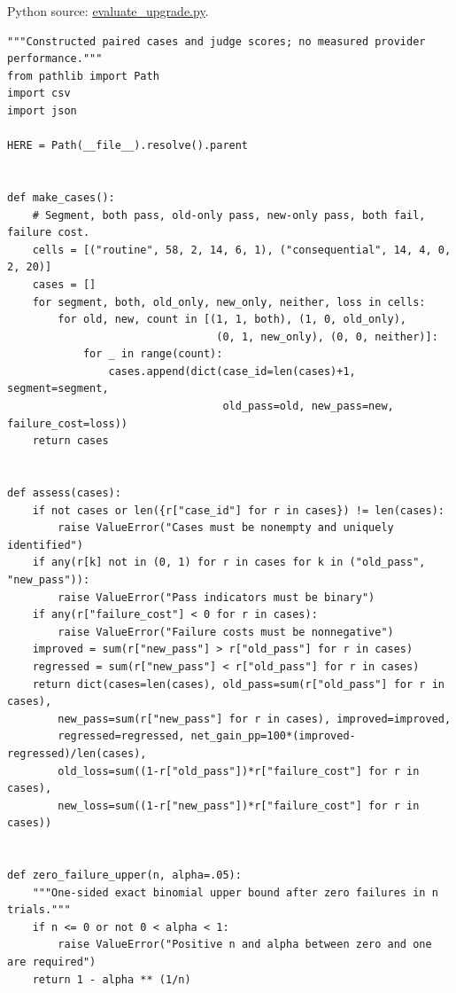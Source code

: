 \FloatBarrier
{}
Python source:
\href{../03_Data_and_Code/LLM_Revalidation/evaluate_upgrade.py}{evaluate\_upgrade.py}.

\begin{Verbatim}[breaklines,breakanywhere,fontsize=\small]
"""Constructed paired cases and judge scores; no measured provider performance."""
from pathlib import Path
import csv
import json

HERE = Path(__file__).resolve().parent


def make_cases():
    # Segment, both pass, old-only pass, new-only pass, both fail, failure cost.
    cells = [("routine", 58, 2, 14, 6, 1), ("consequential", 14, 4, 0, 2, 20)]
    cases = []
    for segment, both, old_only, new_only, neither, loss in cells:
        for old, new, count in [(1, 1, both), (1, 0, old_only),
                                 (0, 1, new_only), (0, 0, neither)]:
            for _ in range(count):
                cases.append(dict(case_id=len(cases)+1, segment=segment,
                                  old_pass=old, new_pass=new, failure_cost=loss))
    return cases


def assess(cases):
    if not cases or len({r["case_id"] for r in cases}) != len(cases):
        raise ValueError("Cases must be nonempty and uniquely identified")
    if any(r[k] not in (0, 1) for r in cases for k in ("old_pass", "new_pass")):
        raise ValueError("Pass indicators must be binary")
    if any(r["failure_cost"] < 0 for r in cases):
        raise ValueError("Failure costs must be nonnegative")
    improved = sum(r["new_pass"] > r["old_pass"] for r in cases)
    regressed = sum(r["new_pass"] < r["old_pass"] for r in cases)
    return dict(cases=len(cases), old_pass=sum(r["old_pass"] for r in cases),
        new_pass=sum(r["new_pass"] for r in cases), improved=improved,
        regressed=regressed, net_gain_pp=100*(improved-regressed)/len(cases),
        old_loss=sum((1-r["old_pass"])*r["failure_cost"] for r in cases),
        new_loss=sum((1-r["new_pass"])*r["failure_cost"] for r in cases))


def zero_failure_upper(n, alpha=.05):
    """One-sided exact binomial upper bound after zero failures in n trials."""
    if n <= 0 or not 0 < alpha < 1:
        raise ValueError("Positive n and alpha between zero and one are required")
    return 1 - alpha ** (1/n)



\end{Verbatim}
